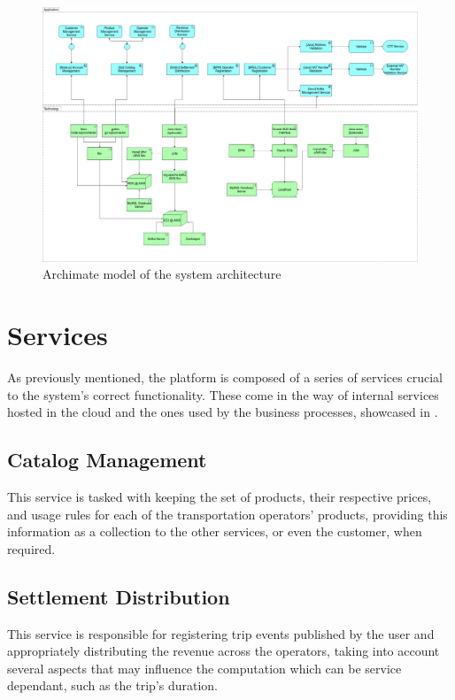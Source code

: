 \documentclass[runningheads,a4]{llncs}
\begin{document}
\begin{figure}
  \centering
  \includegraphics[width=\textwidth]{img/archimate-architecture.png}
  \caption{Archimate model of the system architecture}
  \label{fig:archimate.architecture}
\end{figure}


\newpage
\section{Services}
\label{sec:services}
As previously mentioned, the platform is composed of a series of services
crucial to the system's correct functionality. These come in the way of internal
services hosted in the cloud and the ones used by the business processes,
showcased in .

\subsection{Catalog Management}
\label{sec:services.cloud.catalog}
This service is tasked with keeping the set of products, their respective
prices, and usage rules for each of the transportation operators' products,
providing this information as a collection to the other services, or even the
customer, when required.

\subsection{Settlement Distribution}
\label{sec:services.cloud.settlement}
This service is responsible for registering trip events published by the user
and appropriately distributing the revenue across the operators, taking into
account several aspects that may influence the computation which can be service
dependant, such as the trip's duration.
\end{document}

